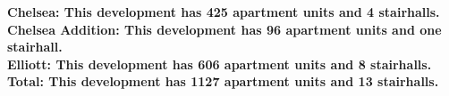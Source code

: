 \bf{Chelsea}: This development has 425 apartment units and 4 stairhalls.\\\bf{Chelsea Addition}: This development has 96 apartment units and one stairhall.\\\bf{Elliott}: This development has 606 apartment units and 8 stairhalls.\\\bf{Total}: This development has 1127 apartment units and 13 stairhalls.\\